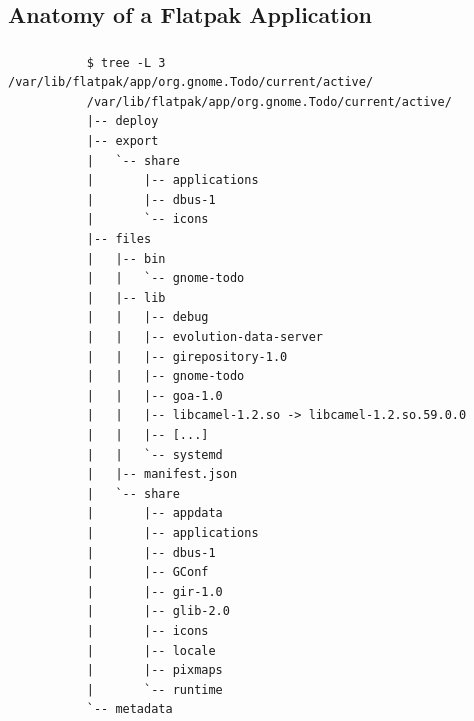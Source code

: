 \subsection{Anatomy of a Flatpak Application}
\begin{frame}[fragile]
  \frametitle{\insertsubsection}

    \begin{tiny}
\begin{verbatim}
           $ tree -L 3 /var/lib/flatpak/app/org.gnome.Todo/current/active/
           /var/lib/flatpak/app/org.gnome.Todo/current/active/
           |-- deploy
           |-- export
           |   `-- share
           |       |-- applications
           |       |-- dbus-1
           |       `-- icons
           |-- files
           |   |-- bin
           |   |   `-- gnome-todo
           |   |-- lib
           |   |   |-- debug
           |   |   |-- evolution-data-server
           |   |   |-- girepository-1.0
           |   |   |-- gnome-todo
           |   |   |-- goa-1.0
           |   |   |-- libcamel-1.2.so -> libcamel-1.2.so.59.0.0
           |   |   |-- [...]
           |   |   `-- systemd
           |   |-- manifest.json
           |   `-- share
           |       |-- appdata
           |       |-- applications
           |       |-- dbus-1
           |       |-- GConf
           |       |-- gir-1.0
           |       |-- glib-2.0
           |       |-- icons
           |       |-- locale
           |       |-- pixmaps
           |       `-- runtime
           `-- metadata
\end{verbatim}
    \end{tiny}
\end{frame}

